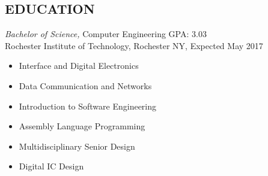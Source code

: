 \documentclass[line,margin]{res}
\begin{document}
\begin{resume}
\section{EDUCATION} {\sl Bachelor of Science,} Computer Engineering GPA: 3.03\\
                Rochester Institute of Technology, Rochester NY, 
				Expected May 2017 %
				\begin{multicols}{2}
					\begin{itemize}
						\itemsep -2pt
						\item[] Interface and Digital Electronics
						\item[] Data Communication and Networks
						\item[] Introduction to Software Engineering
						\item[] Assembly Language Programming
						\item[] Multidisciplinary Senior Design
						\item[] Digital IC Design
						
					\end{itemize}
				\end{multicols}
 

\end{resume}
\end{document}
